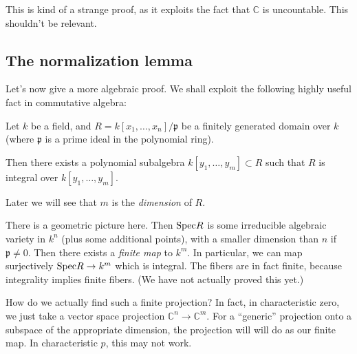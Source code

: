 This is kind of a strange proof, as it exploits the fact that $\mathbb{C}$ is
uncountable. 
This shouldn't be relevant.

\subsection{The normalization lemma}

Let's now give a more algebraic proof. 
We shall exploit the following highly useful fact in commutative algebra:

\begin{theorem} Let $k$ be a field, and $R =
k[x_1, \dots, x_n]/\mathfrak{p}$ be a finitely generated domain over $k$ (where
$\mathfrak{p}$ is a prime ideal in the polynomial ring).

Then there exists a polynomial subalgebra $k[y_1, \dots, y_m] \subset R$ such
that $R$ is integral over $k[y_1, \dots, y_m]$. 
\end{theorem} 

Later we will see that $m$ is the \emph{dimension} of $R$.

There is a geometric picture here. Then $\mathrm{Spec} R$ is some irreducible algebraic
variety in $k^n$ (plus some additional points), with a smaller dimension than
$n$ if $\mathfrak{p} \neq 0$. Then there exists a \emph{finite map} to $k^m$.
In particular, we can map surjectively $\mathrm{Spec} R \to k^m$ which is integral.
The fibers are in fact finite, because integrality implies finite fibers.  (We
have not actually proved this yet.)

How do we actually find such a finite projection? In fact, in characteristic
zero, we just take a
vector space projection $\mathbb{C}^n \to \mathbb{C}^m$. For a ``generic''
projection onto a subspace of the appropriate dimension, the projection will 
will do as our finite map. In characteristic $p$, this may not work.

